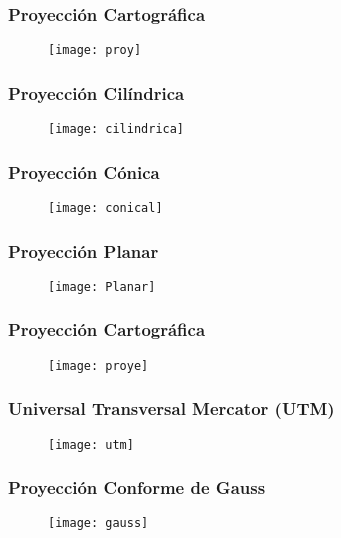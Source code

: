 \documentclass[14pt]{beamer}
\begin{document}
\begin{frame}
\frametitle{Proyección Cartográfica}
  \begin{figure}
    \centering
    \texttt{[image: proy]}
  \end{figure}
\end{frame}
\begin{frame}
\frametitle{Proyección Cilíndrica}
  \begin{figure}
    \centering
    \texttt{[image: cilindrica]}
  \end{figure}
\end{frame}
\begin{frame}
\frametitle{Proyección Cónica}
  \begin{figure}
    \centering
    \texttt{[image: conical]}
  \end{figure}
\end{frame}
\begin{frame}
\frametitle{Proyección Planar}
  \begin{figure}
    \centering
    \texttt{[image: Planar]}
  \end{figure}
\end{frame}
\begin{frame}
\frametitle{Proyección Cartográfica}
  \begin{figure}
    \centering
    \texttt{[image: proye]}
  \end{figure}
\end{frame}
\begin{frame}
\frametitle{Universal Transversal Mercator (UTM)}
  \begin{figure}
    \centering
    \texttt{[image: utm]}
  \end{figure}
\end{frame}
\begin{frame}
\frametitle{Proyección Conforme de Gauss}
  \begin{figure}
    \centering
    \texttt{[image: gauss]}
  \end{figure}
\end{frame}
\end{document}
